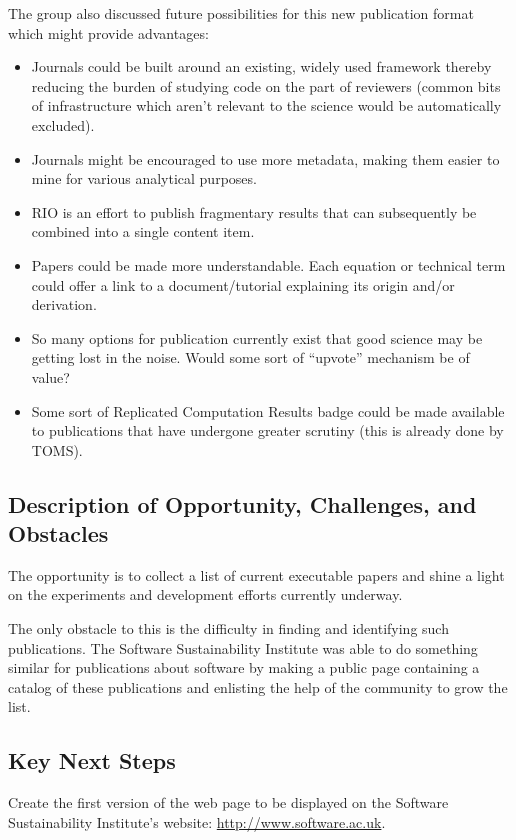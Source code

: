 The group also discussed future possibilities for this new publication format which might
provide advantages:
\begin{itemize}
\item Journals could be built around an existing, widely used framework thereby reducing
  the burden of studying code on the part of reviewers (common bits of infrastructure
  which aren't relevant to the science would be automatically excluded).
\item Journals might be encouraged to use more metadata, making them easier to mine
  for various analytical purposes.
\item RIO is an effort to publish fragmentary results that can subsequently be combined
  into a single content item.
\item Papers could be made more understandable. Each equation or technical term could
  offer a link to a document/tutorial explaining its origin and/or derivation.
\item So many options for publication currently exist that good science may be getting
  lost in the noise. Would some sort of ``upvote'' mechanism be of value?
\item Some sort of Replicated Computation Results badge could be made available to
  publications that have undergone greater scrutiny (this is already done by TOMS).
\end{itemize}

\subsection{Description of Opportunity, Challenges, and Obstacles}

The opportunity is to collect a list of current executable papers and
shine a light on the experiments and development efforts currently underway.

The only obstacle to this is the difficulty in finding and identifying such
publications. The Software Sustainability Institute was able to do something similar
for publications about software by making a public page containing a catalog
of these publications and enlisting the help of the community to grow the list.

\subsection{Key Next Steps}

Create the first version of the web page to be displayed on the Software Sustainability
Institute's website: \url{http://www.software.ac.uk}. 

